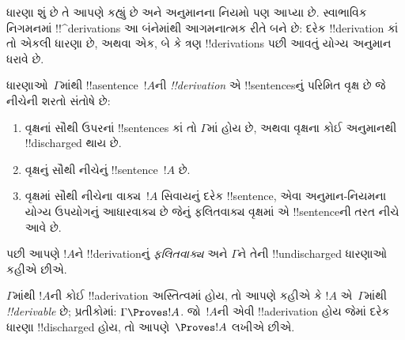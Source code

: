 \documentclass[../../../include/open-logic-section]{subfiles}
\begin{document}
      {}
      {}


\begin{explain}
ધારણા શું છે તે આપણે કહ્યું છે અને અનુમાનના નિયમો પણ આપ્યા છે.
સ્વાભાવિક નિગમનમાં !!^{derivation}s આ બંનેમાંથી આગમનાત્મક રીતે બને છે:
દરેક !!{derivation} કાં તો એકલી ધારણા છે, અથવા એક, બે કે ત્રણ
!!{derivation}s પછી આવતું યોગ્ય અનુમાન ધરાવે છે.
\end{explain}

\begin{defn}[!!^{derivation}]
ધારણાઓ~$\Gamma$માંથી !!a{sentence}~$!A$ની \emph{!!{derivation}} એ
!!{sentence}sનું પરિમિત વૃક્ષ છે જે નીચેની શરતો સંતોષે છે:
\begin{enumerate}
\item વૃક્ષનાં સૌથી ઉપરનાં !!{sentence}s કાં તો $\Gamma$માં હોય છે,
  અથવા વૃક્ષના કોઈ અનુમાનથી !!{discharged} થાય છે.
\item વૃક્ષનું સૌથી નીચેનું !!{sentence}~$!A$ છે.
\item વૃક્ષમાં સૌથી નીચેના વાક્ય~$!A$ સિવાયનું દરેક !!{sentence},
  એવા અનુમાન-નિયમના યોગ્ય ઉપયોગનું આધારવાક્ય છે જેનું ફલિતવાક્ય
  વૃક્ષમાં એ !!{sentence}ની તરત નીચે આવે છે.
\end{enumerate}
પછી આપણે $!A$ને !!{derivation}નું \emph{ફલિતવાક્ય} અને $\Gamma$ને
તેની !!{undischarged} ધારણાઓ કહીએ છીએ.

$\Gamma$માંથી $!A$ની કોઈ !!a{derivation} અસ્તિત્વમાં હોય, તો આપણે
કહીએ કે $!A$ એ~$\Gamma$માંથી \emph{!!{derivable}} છે; પ્રતીકોમાં:
$\Gamma \Proves !A$. જો~$!A$ની એવી !!a{derivation} હોય જેમાં દરેક
ધારણા !!{discharged} હોય, તો આપણે~$\Proves !A$ લખીએ છીએ.
\end{defn}
\end{document}
